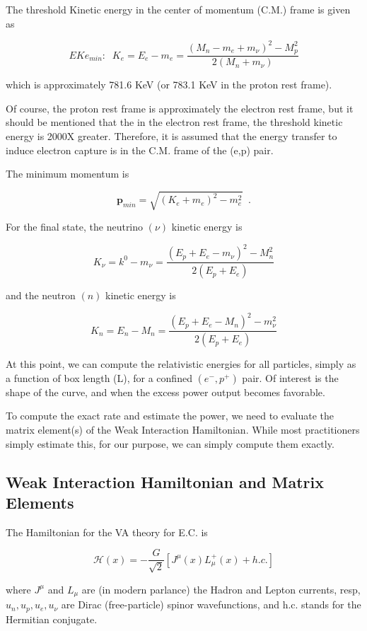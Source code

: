 \documentclass[%
 aip,
 jmp,%
 amsmath,amssymb,
 reprint,%
]{revtex4-1}
\begin{document}
The threshold Kinetic energy in the center of momentum (C.M.) frame is given as

$$EKe_{min}:\;\;K_{e}=E_{e}-m_{e}=\dfrac{(M_{n}-m_{e}+m_{\nu})^{2}-M^{2}_{p}}{2(M_{n}+m_{\nu})}$$

which is approximately 781.6 KeV (or 783.1 KeV in the proton rest frame).

Of course, the proton rest frame is approximately the electron rest frame, but it should be mentioned that the in the electron rest frame, the threshold kinetic energy is 2000X greater.  Therefore, it is assumed that the energy transfer to induce electron capture is in the C.M. frame of the (e,p) pair.

The minimum momentum is 

$$\mathbf{p}_{min}=\sqrt{(K_{e}+m_{e})^{2}-m_{e}^{2}}\;\;.$$

For the final state, the neutrino $(\nu)$ kinetic energy is

$$K_{\nu}=k^{0}-m_{\nu}=\dfrac{(E_{p}+E_{e}-m_{\nu})^{2}-M^{2}_{n}}{2(E_{p}+E_{e})}$$

and the neutron $(n)$ kinetic energy is

$$K_{n}=E_{n}-M_{n}=\dfrac{(E_{p}+E_{e}-M_{n})^{2}-m^{2}_{\nu}}{2(E_{p}+E_{e})}$$

At this point, we can compute the relativistic energies for all particles, simply as a function of box length (L), for a confined $(e^{-},p^{+})$ pair.  Of interest is the shape of the curve, and when the excess power output becomes favorable.  

To compute the exact rate and estimate the power, we need to evaluate the matrix element(s) of the Weak Interaction Hamiltonian.  
While most practitioners simply estimate this, for our purpose, we can simply compute them exactly.

\subsection{Weak Interaction Hamiltonian and Matrix Elements}

The Hamiltonian for the VA theory for E.C. is \cite{ec-review1,ec-review2,langanke,} 

$$\mathcal{H}(x)=-\dfrac{G}{\sqrt{2}}\left[J^{\mu}(x)L^{+}_{\mu}(x)+h.c.\right]$$

where $J^{\mu}$ and $L_{\mu}$ are (in modern parlance) the Hadron and Lepton currents, resp,  
$u_{n},u_{p},u_{e},u_{\nu}$ are Dirac (free-particle) spinor wavefunctions, and h.c. stands for the Hermitian conjugate.
\end{document}
